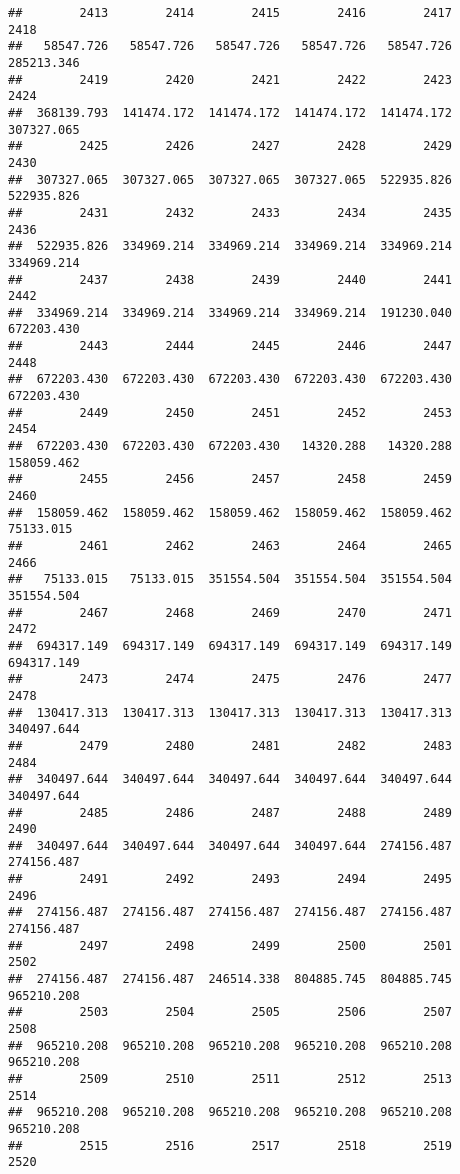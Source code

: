 \documentclass[
]{book}
\begin{document}
\begin{verbatim}
##        2413        2414        2415        2416        2417        2418 
##   58547.726   58547.726   58547.726   58547.726   58547.726  285213.346 
##        2419        2420        2421        2422        2423        2424 
##  368139.793  141474.172  141474.172  141474.172  141474.172  307327.065 
##        2425        2426        2427        2428        2429        2430 
##  307327.065  307327.065  307327.065  307327.065  522935.826  522935.826 
##        2431        2432        2433        2434        2435        2436 
##  522935.826  334969.214  334969.214  334969.214  334969.214  334969.214 
##        2437        2438        2439        2440        2441        2442 
##  334969.214  334969.214  334969.214  334969.214  191230.040  672203.430 
##        2443        2444        2445        2446        2447        2448 
##  672203.430  672203.430  672203.430  672203.430  672203.430  672203.430 
##        2449        2450        2451        2452        2453        2454 
##  672203.430  672203.430  672203.430   14320.288   14320.288  158059.462 
##        2455        2456        2457        2458        2459        2460 
##  158059.462  158059.462  158059.462  158059.462  158059.462   75133.015 
##        2461        2462        2463        2464        2465        2466 
##   75133.015   75133.015  351554.504  351554.504  351554.504  351554.504 
##        2467        2468        2469        2470        2471        2472 
##  694317.149  694317.149  694317.149  694317.149  694317.149  694317.149 
##        2473        2474        2475        2476        2477        2478 
##  130417.313  130417.313  130417.313  130417.313  130417.313  340497.644 
##        2479        2480        2481        2482        2483        2484 
##  340497.644  340497.644  340497.644  340497.644  340497.644  340497.644 
##        2485        2486        2487        2488        2489        2490 
##  340497.644  340497.644  340497.644  340497.644  274156.487  274156.487 
##        2491        2492        2493        2494        2495        2496 
##  274156.487  274156.487  274156.487  274156.487  274156.487  274156.487 
##        2497        2498        2499        2500        2501        2502 
##  274156.487  274156.487  246514.338  804885.745  804885.745  965210.208 
##        2503        2504        2505        2506        2507        2508 
##  965210.208  965210.208  965210.208  965210.208  965210.208  965210.208 
##        2509        2510        2511        2512        2513        2514 
##  965210.208  965210.208  965210.208  965210.208  965210.208  965210.208 
##        2515        2516        2517        2518        2519        2520 

\end{verbatim}
\end{document}
